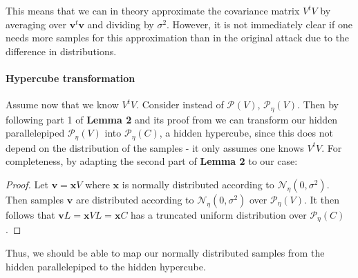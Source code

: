 \documentclass[12 pt]{article}        	%
\newcommand{\PP}[2][]{\mathcal{P}_{#1}(\mat{#2})}
\newcommand{\mat}[1]{\mathit{#1}}
\renewcommand{\vec}[1]{\mathbf{#1}}
\begin{document}
This means that we can in theory approximate the covariance matrix $\mat{V}^t \mat{V}$ by averaging over $\vec{v}^t \vec{v}$ and dividing by $\sigma ^2$. 
However, it is not immediately clear if one needs more samples for this approximation than in the original attack due to the difference in distributions.

\paragraph{Hypercube transformation}
Assume now that we know $\mat{V}^t \mat{V}$. Consider instead of $\PP{V}$, $\PP[\eta]{V}$.
Then by following part 1 of \textbf{Lemma 2} and its proof from \cite{NR09} we can transform our hidden parallelepiped $\PP[\eta]{V}$ into $\PP[\eta]{C}$, a hidden hypercube,
since this does not depend on the distribution of the samples - it only assumes one knows $\mat{V}^t\mat{V}$.
For completeness, by adapting the second part of \textbf{Lemma 2} to our case: 
\begin{proof}
    Let $\vec{v} = \vec{x}\mat{V}$ where $\vec{x}$ is normally distributed according to $\mathcal{N}_{\eta}(0, \sigma^2)$.
    Then samples $\vec{v}$ are distributed according to $\mathcal{N}_{\eta}(0, \sigma^2)$ over $\PP[\eta]{V}$.
    It then follows that $\vec{v}\mat{L} = \vec{x}\mat{V}\mat{L} = \vec{x}\mat{C}$ has a truncated uniform distribution over $\PP[\eta]{C}$.
\end{proof}
Thus, we should be able to map our normally distributed samples from the hidden parallelepiped to the hidden hypercube.
\end{document}
